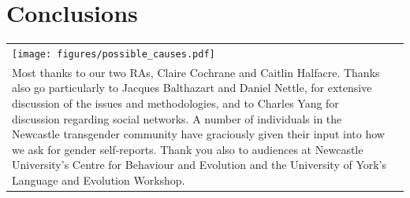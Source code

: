 \documentclass[a0,portrait]{a0poster}
\begin{document}

\color{SaddleBrown} %
\section*{Conclusions}
\begin{tabular}[b]{ll}
\texttt{[image: figures/possible\_causes.pdf]}

&
\vspace{-10cm}
%
\color{DarkSlateGray}
  \begin{tikzpicture}
\node[draw,fill=gray!50,rectangle,text width=.25\textwidth, rounded corners=3pt] 
  {\textbf{\LARGE{Acknowledgements}}\\  \vspace{1cm} \sloppy Most thanks to our two RAs, Claire Cochrane and Caitlin Halfacre. Thanks also go particularly to Jacques Balthazart and Daniel Nettle, for extensive discussion of the issues and methodologies, and to Charles Yang for discussion regarding social networks. A number of individuals in the Newcastle transgender community have graciously given their input into how we ask for gender self-reports. Thank you also to audiences at Newcastle University's Centre for Behaviour and Evolution and the University of York's Language and Evolution Workshop. \vspace{2.4cm}
};
    \end{tikzpicture} 

\end{tabular}



\clearpage

\end{document}
